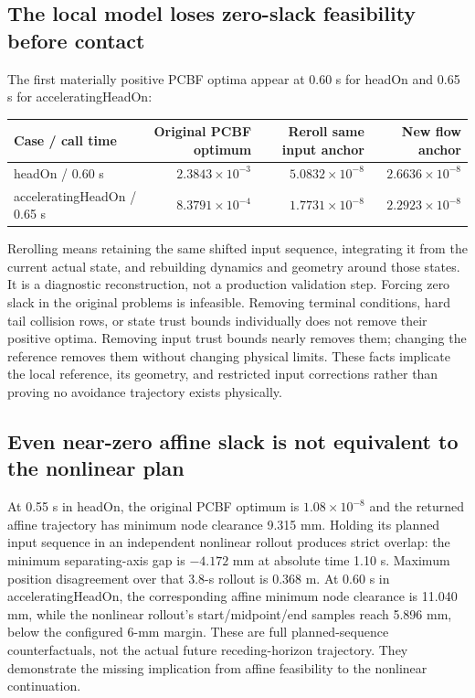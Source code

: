 \documentclass[11pt]{article}
\begin{document}
\subsection{The local model loses zero-slack feasibility before contact}
The first materially positive PCBF optima appear at 0.60 s for headOn and
0.65 s for acceleratingHeadOn:
\begin{center}\small
\begin{tabular}{l r r r}
\toprule
Case / call time & Original PCBF optimum & Reroll same input anchor & New flow anchor\\
\midrule
headOn / 0.60 s & $2.3843\times10^{-3}$ & $5.0832\times10^{-8}$ & $2.6636\times10^{-8}$\\
acceleratingHeadOn / 0.65 s & $8.3791\times10^{-4}$ & $1.7731\times10^{-8}$ & $2.2923\times10^{-8}$\\
\bottomrule
\end{tabular}\end{center}
Rerolling means retaining the same shifted input sequence, integrating it from
the current actual state, and rebuilding dynamics and geometry around those
states. It is a diagnostic reconstruction, not a production validation step.
Forcing zero slack in the original problems is infeasible. Removing terminal
conditions, hard tail collision rows, or state trust bounds individually does
not remove their positive optima. Removing input trust bounds nearly removes
them; changing the reference removes them without changing physical limits.
These facts implicate the local reference, its geometry, and restricted input
corrections rather than proving no avoidance trajectory exists physically.

\subsection{Even near-zero affine slack is not equivalent to the nonlinear plan}
At 0.55 s in headOn, the original PCBF optimum is
$1.08\times10^{-8}$ and the returned affine trajectory has minimum node
clearance 9.315 mm. Holding its planned input sequence in an independent
nonlinear rollout produces strict overlap: the minimum separating-axis gap is $-4.172$ mm
at absolute time 1.10 s. Maximum position disagreement over that
3.8-s rollout is 0.368 m. At 0.60 s in acceleratingHeadOn, the corresponding
affine minimum node clearance is 11.040 mm, while the nonlinear rollout's
start/midpoint/end samples reach 5.896 mm, below the configured 6-mm margin.
These are full planned-sequence counterfactuals, not the actual future
receding-horizon trajectory. They demonstrate the missing implication from
affine feasibility to the nonlinear continuation.
\end{document}
